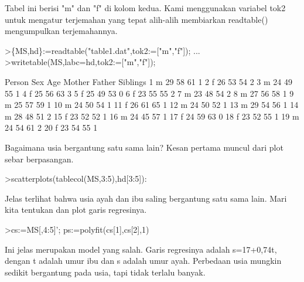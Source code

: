 \documentclass{article}
\begin{document}
\begin{eulernotebook}
\begin{eulercomment}
\begin{eulercomment}
\begin{eulercomment}
Tabel ini berisi "m" dan "f" di kolom kedua. Kami menggunakan variabel
tok2 untuk mengatur terjemahan yang tepat alih-alih membiarkan
readtable() mengumpulkan terjemahannya.
\end{eulercomment}
\begin{eulerprompt}
>\{MS,hd\}:=readtable("table1.dat",tok2:=["m","f"]);  ...
>writetable(MS,labc=hd,tok2:=["m","f"]);
\end{eulerprompt}
\begin{euleroutput}
      Person       Sex       Age    Mother    Father  Siblings
           1         m        29        58        61         1
           2         f        26        53        54         2
           3         m        24        49        55         1
           4         f        25        56        63         3
           5         f        25        49        53         0
           6         f        23        55        55         2
           7         m        23        48        54         2
           8         m        27        56        58         1
           9         m        25        57        59         1
          10         m        24        50        54         1
          11         f        26        61        65         1
          12         m        24        50        52         1
          13         m        29        54        56         1
          14         m        28        48        51         2
          15         f        23        52        52         1
          16         m        24        45        57         1
          17         f        24        59        63         0
          18         f        23        52        55         1
          19         m        24        54        61         2
          20         f        23        54        55         1
\end{euleroutput}
\begin{eulercomment}
Bagaimana usia bergantung satu sama lain? Kesan pertama muncul dari
plot sebar berpasangan.
\end{eulercomment}
\begin{eulerprompt}
>scatterplots(tablecol(MS,3:5),hd[3:5]):
\end{eulerprompt}
\begin{eulercomment}
Jelas terlihat bahwa usia ayah dan ibu saling bergantung satu sama
lain. Mari kita tentukan dan plot garis regresinya.
\end{eulercomment}
\begin{eulerprompt}
>cs:=MS[,4:5]'; ps:=polyfit(cs[1],cs[2],1)
\end{eulerprompt}
\begin{euleroutput}
  [17.3789,  0.740964]
\end{euleroutput}
\begin{eulercomment}
Ini jelas merupakan model yang salah. Garis regresinya adalah
s=17+0,74t, dengan t adalah umur ibu dan s adalah umur ayah. Perbedaan
usia mungkin sedikit bergantung pada usia, tapi tidak terlalu banyak.


\end{eulercomment}
\end{eulercomment}
\end{eulercomment}
\end{eulernotebook}
\end{document}
